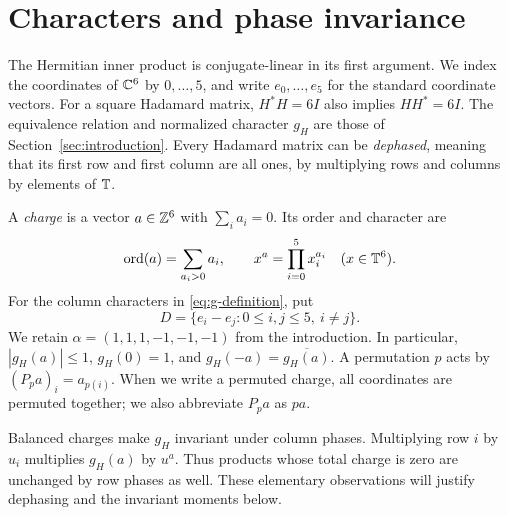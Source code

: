 \section{Characters and phase invariance}\label{sec:preliminaries}

The Hermitian inner product is conjugate-linear in its first argument.
We index the coordinates of \(\mathbb C^6\) by \(0,\ldots,5\), and write
\(e_0,\ldots,e_5\) for the standard coordinate vectors.
For a square Hadamard matrix, $H^*H=6I$ also implies $HH^*=6I$.
The equivalence relation and normalized character $g_H$ are those of
Section~\ref{sec:introduction}. Every Hadamard matrix can be
\emph{dephased}, meaning that its first row and first column are all ones,
by multiplying rows and columns by elements of $\mathbb T$.

A \emph{charge} is a vector \(a\in\mathbb Z^6\) with \(\sum_i a_i=0\).
Its order and character are
\[
 \operatorname{ord}(a)=\sum_{a_i>0}a_i,
 \qquad x^a=\prod_{i=0}^5x_i^{a_i}\quad(x\in\mathbb T^6).
\]
For the column characters in \eqref{eq:g-definition}, put
\[
 D=\{e_i-e_j:0\le i,j\le5,\ i\ne j\}.
\]
We retain $\alpha=(1,1,1,-1,-1,-1)$ from the introduction.
In particular, \(|g_H(a)|\le1\), \(g_H(0)=1\), and
\(g_H(-a)=\overline{g_H(a)}\). A permutation \(p\) acts by
\((P_pa)_i=a_{p(i)}\). When we write a permuted charge, all coordinates are
permuted together; we also abbreviate \(P_pa\) as \(pa\).

Balanced charges make \(g_H\) invariant under column phases. Multiplying
row \(i\) by \(u_i\) multiplies \(g_H(a)\) by \(u^a\). Thus products
whose total charge is zero are unchanged by row phases as well.
These elementary observations will justify dephasing and the invariant
moments below.

